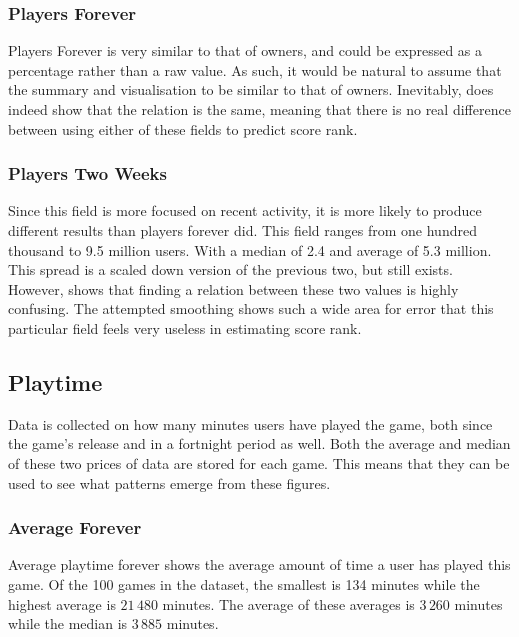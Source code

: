 \documentclass[dataset.tex]{subfiles}
\begin{document}
\subsubsection{Players Forever} %
\label{ssub:players_forever}
Players Forever is very similar to that of owners, and could be expressed as a
percentage rather than a raw value. As such, it would be natural to assume that
the summary and visualisation to be similar to that of owners. Inevitably, 
 does indeed show that the relation is the same, meaning
that there is no real difference between using either of these fields to predict
score rank.

\subsubsection{Players Two Weeks} %
\label{ssub:players_two_weeks}
Since this field is more focused on recent activity, it is more likely to
produce different results than players forever did. This field ranges from
one hundred thousand to 9.5 million users. With a median of 2.4 and average of
5.3 million. This spread is a scaled down version of the previous two, but still
exists. However,  shows that finding a relation between
these two values is highly confusing. The attempted smoothing shows such a wide
area for error that this particular field feels very useless in estimating
score rank.

\subsection{Playtime} %
\label{sub:playtime}
Data is collected on how many minutes users have played the game, both since the
game's release and in a fortnight period as well. Both the average and median of
these two prices of data are stored for each game. This means that they can be
used to see what patterns emerge from these figures.

\subsubsection{Average Forever} %
\label{ssub:average_forever}
Average playtime forever shows the average amount of time a user has played
this game. Of the 100 games in the dataset, the smallest is 134 minutes while
the highest average is \(21\,480\) minutes. The average of these averages is
\(3\,260\) minutes while the median is \(3\,885\) minutes.
\end{document}
